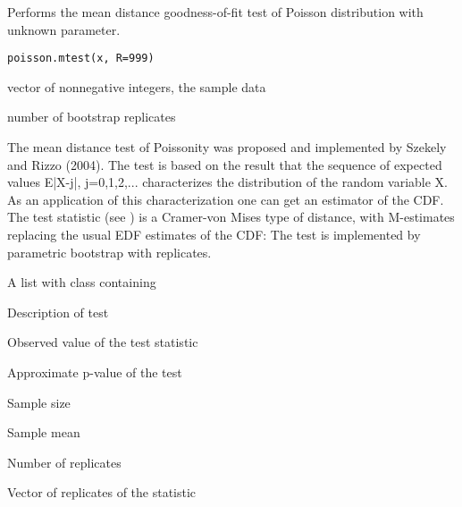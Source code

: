 \documentclass{article}
\begin{document}
\begin{Description}\relax
Performs the mean distance goodness-of-fit test of Poisson distribution
with unknown parameter.
\end{Description}
\begin{Usage}
\begin{verbatim}
poisson.mtest(x, R=999)
\end{verbatim}
\end{Usage}
\begin{Arguments}
\begin{ldescription}
\item[\code{x}] vector of nonnegative integers, the sample data 
\item[\code{R}] number of bootstrap replicates 
\end{ldescription}
\end{Arguments}
\begin{Details}\relax
The mean distance test of Poissonity was proposed and implemented by 
Szekely and Rizzo (2004). The test is based on the result that the sequence 
of expected values E|X-j|, j=0,1,2,... characterizes the distribution of 
the random  variable X. As an application of this characterization one can 
get an estimator  of the CDF. The test statistic 
(see ) is a Cramer-von Mises type of distance, with 
M-estimates replacing the usual EDF estimates of the CDF:
 The test is implemented by parametric bootstrap with 
 replicates.
\end{Details}
\begin{Value}
A list with class  containing
\begin{ldescription}
\item[\code{method}] Description of test
\item[\code{statistic}] Observed value of the test statistic
\item[\code{p.value}] Approximate p-value of the test
\item[\code{n}] Sample size
\item[\code{lambda}] Sample mean
\item[\code{R}] Number of replicates
\item[\code{replicates}] Vector of replicates of the statistic
\end{ldescription}
\end{Value}
\end{document}
